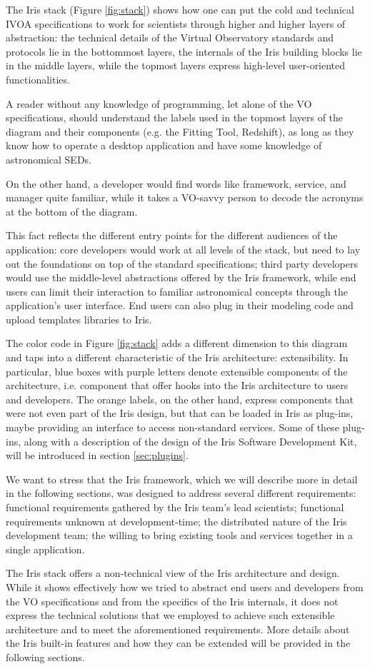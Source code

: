 The Iris stack (Figure \ref{fig:stack}) shows how one can put the cold and technical IVOA specifications to work for scientists through higher and higher layers of abstraction: the technical details of the Virtual Observatory standards and protocols lie in the bottommost layers, the internals of the Iris building blocks lie in the middle layers, while the topmost layers express high-level user-oriented functionalities.

A reader without any knowledge of programming, let alone of the VO specifications, should understand the labels used in the topmost layers of the diagram and their components (e.g. the Fitting Tool, Redshift), as long as they know how to operate a desktop application and have some knowledge of astronomical SEDs.

On the other hand, a developer would find words like framework, service, and manager quite familiar, while it takes a VO-savvy person to decode the acronyms at the bottom of the diagram.

This fact reflects the different entry points for the different audiences of the application: core developers would work at all levels of the stack, but need to lay out the foundations on top of the standard specifications; third party developers would use the middle-level abstractions offered by the Iris framework, while end users can limit their interaction to familiar astronomical concepts through the application's user interface. End users can also plug in their modeling code and upload templates libraries to Iris.

The color code in Figure \ref{fig:stack} adds a different dimension to this diagram and taps into a different characteristic of the Iris architecture: extensibility. In particular, blue boxes with purple letters denote extensible components of the architecture, i.e. component that offer hooks into the Iris architecture to users and developers. The orange labels, on the other hand, express components that were not even part of the Iris design, but that can be loaded in Iris as plug-ins, maybe providing an interface to access non-standard services. Some of these plug-ins, along with a description of the design of the Iris Software Development Kit, will be introduced in section \ref{sec:plugins}.

We want to stress that the Iris framework, which we will describe more in detail in the following sections, was designed to address several different requirements:
functional requirements gathered by the Iris team's lead scientists;
functional requirements unknown at development-time;
the distributed nature of the Iris development team;
the willing to bring existing tools and services together in a single application.

The Iris stack offers a non-technical view of the Iris architecture and design. While it shows effectively how we tried to abstract end users and developers from the VO specifications and from the specifics of the Iris internals, it does not express the technical solutions that we employed to achieve such extensible architecture and to meet the aforementioned requirements. More details about the Iris built-in features and how they can be extended will be provided in the following sections.
